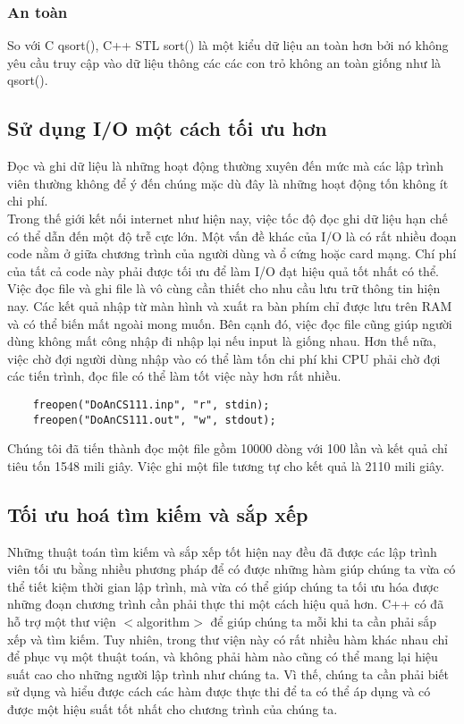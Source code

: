\documentclass{article}
\begin{document}
\subsubsection{An toàn}
So với C qsort(), C++ STL sort() là một kiểu dữ liệu an toàn hơn bởi nó không yêu cầu truy cập vào dữ liệu thông các các con trỏ không an toàn giống như là qsort().



\subsection{Sử dụng I/O một cách tối ưu hơn}
Đọc và ghi dữ liệu là những hoạt động thường xuyên đến mức mà các lập trình viên thường không để ý đến chúng mặc dù đây là những hoạt động tốn không ít chi phí.\\

Trong thế giới kết nối internet như hiện nay, việc tốc độ đọc ghi dữ liệu hạn chế có thể dẫn đến một độ trễ cực lớn. Một vấn đề khác của I/O là có rất nhiều đoạn code nằm ở giữa chương trình của người dùng và ổ cứng hoặc card mạng. Chí phí của tất cả code này phải được tối ưu để làm I/O đạt hiệu quả tốt nhất có thể.\\

Việc đọc file và ghi file là vô cùng cần thiết cho nhu cầu lưu trữ thông tin hiện nay. Các kết quả nhập từ màn hình và xuất ra bàn phím chỉ được lưu trên RAM và có thể biến mất ngoài mong muốn. Bên cạnh đó, việc đọc file cũng giúp người dùng không mất công nhập đi nhập lại nếu input là giống nhau. Hơn thế nữa, việc chờ đợi người dùng nhập vào có thể làm tốn chi phí khi CPU phải chờ đợi các tiến trình, đọc file có thể làm tốt việc này hơn rất nhiều.\\

\begin{verbatim}
    freopen("DoAnCS111.inp", "r", stdin);
    freopen("DoAnCS111.out", "w", stdout);
\end{verbatim}


Chúng tôi đã tiến thành đọc một file gồm 10000 dòng với 100 lần và kết quả chỉ tiêu tốn 1548 mili giây. Việc ghi một file tương tự cho kết quả là 2110 mili giây.


\subsection{Tối ưu hoá tìm kiếm và sắp xếp}
Những thuật toán tìm kiếm và sắp xếp tốt hiện nay đều đã được các lập trình viên tối ưu bằng nhiều phương pháp để có được những hàm giúp chúng ta vừa có thể tiết kiệm thời gian lập trình, mà vừa có thể giúp chúng ta tối ưu hóa được những đoạn chương trình cần phải thực thi một cách hiệu quả hơn. C++ có đã hỗ trợ một thư viện $<$algorithm$>$ để giúp chúng ta mỗi khi ta cần phải sắp xếp và tìm kiếm. Tuy nhiên, trong thư viện này có rất nhiều hàm khác nhau chỉ để phục vụ một thuật toán, và không phải hàm nào cũng có thể mang lại hiệu suất cao cho những người lập trình như chúng ta. Vì thế, chúng ta cần phải biết sử dụng và hiểu được cách các hàm được thực thi để ta có thể áp dụng và có được một hiệu suất tốt nhất cho chương trình của chúng ta.
\end{document}
